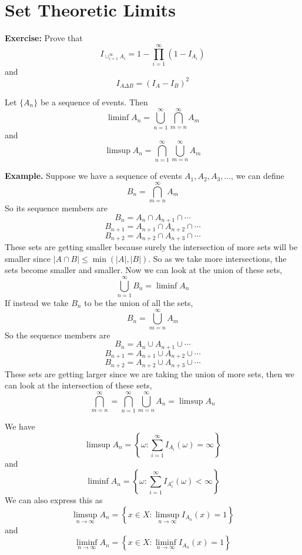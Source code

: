 \documentclass[openany]{report}
\begin{document}
\section{Set Theoretic Limits}
\textbf{Exercise:} Prove that
\[I_{\cup_{i=1}^\infty A_i} = 1 - \prod_{i=1}^\infty(1 - I_{A_i})\]
and 
\[I_{A \Delta B}= (I_A - I_B)^2\]
\begin{definition}
    Let $\{A_n\}$ be a sequence of events. Then 
    \[\liminf A_n = \bigcup_{n=1}^\infty \bigcap_{m=n}^\infty A_m\]
    and
    \[\limsup A_n = \bigcap_{n=1}^\infty \bigcup_{m=n}^\infty A_m\]
\end{definition}
\noindent
\textbf{Example.} Suppose we have a sequence of events $A_1, A_2, A_3, \ldots$, we can define 
\[B_n = \bigcap_{m=n}^\infty A_m\]
So its sequence members are 
\[B_n = A_n \cap A_{n+1} \cap \cdots\]
\[B_{n+1} = A_{n+1} \cap A_{n+2} \cap \cdots\]
\[B_{n+2} = A_{n+2} \cap A_{n+3} \cap \cdots\]
These sets are getting smaller because surely the intersection of more sets will be smaller since $|A \cap B| \leq \min(|A|, |B|)$. So as we take more intersections, the sets become smaller and smaller. Now we can look at the union of these sets, 
\[\bigcup_{n=1}^\infty B_n = \liminf A_n\]
If instead we take $B_n$ to be the union of all the sets, 
\[B_n = \bigcup_{m=n}^\infty A_m\]
So the sequence members are 
\[B_n = A_n \cup A_{n+1} \cup \cdots\]
\[B_{n+1} = A_{n+1} \cup A_{n+2} \cup \cdots\]
\[B_{n+2} = A_{n+2} \cup A_{n+3} \cup \cdots\]
These sets are getting larger since we are taking the union of more sets, then we can look at the intersection of these sets,
\[\bigcap_{m=n}^\infty = \bigcap_{n=1}^\infty \bigcup_{m=n}^\infty A_n = \limsup A_n\]
\begin{lemma}
    We have 
    \[\limsup A_n = \left\{\omega: \sum_{i=1}^\infty I_{A_i}(\omega) = \infty \right\}\]
    and 
    \[\liminf A_n = \left\{\omega: \sum_{i=1}^\infty I_{A_i^c}(\omega) < \infty \right\}\]
    We can also express this as 
    \[\limsup_{n\rightarrow\infty} A_n = \left\{x \in X : \limsup_{n\rightarrow \infty} I_{A_n}(x) = 1\right\}\]
    and 
    \[\liminf_{n\rightarrow\infty} A_n = \left\{x \in X : \liminf_{n\rightarrow \infty} I_{A_n}(x) = 1\right\}\]
\end{lemma}
\end{document}
